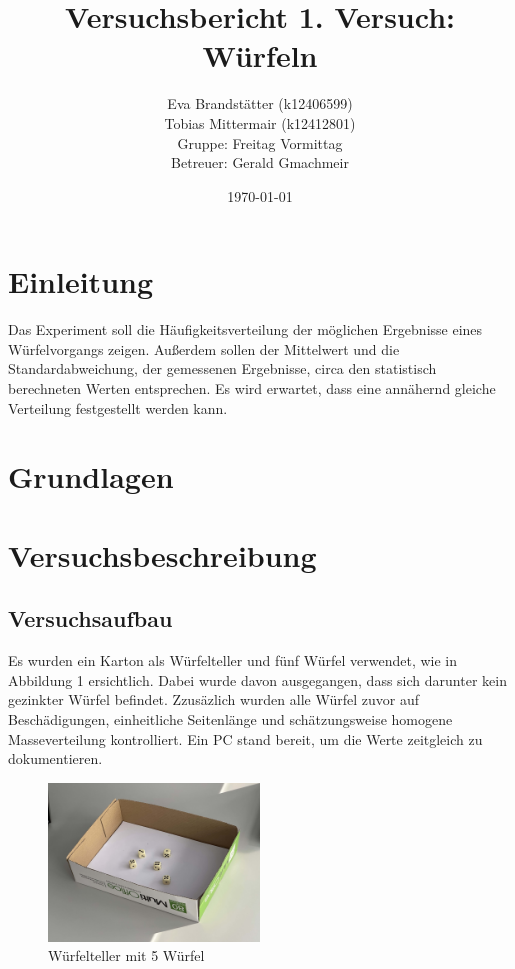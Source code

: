 \documentclass[a4paper,12pt]{article}
\title{Versuchsbericht 1. Versuch: \\ \textbf{Würfeln}}
\author{Eva Brandstätter (k12406599)\\Tobias Mittermair (k12412801)\\Gruppe: Freitag Vormittag\\Betreuer: Gerald Gmachmeir}
\date{\today}
\begin{document}
\maketitle

\section{Einleitung}
Das Experiment soll die Häufigkeitsverteilung der möglichen Ergebnisse eines Würfelvorgangs zeigen. 
Außerdem sollen der Mittelwert und die Standardabweichung, der gemessenen Ergebnisse, circa den statistisch 
berechneten Werten entsprechen. Es wird erwartet, dass eine annähernd gleiche Verteilung festgestellt werden kann.

\section{Grundlagen}

\section{Versuchsbeschreibung}
\subsection{Versuchsaufbau}

Es wurden ein Karton als Würfelteller und fünf Würfel verwendet, wie in Abbildung 1 ersichtlich. Dabei wurde davon ausgegangen, 
dass sich darunter kein gezinkter Würfel befindet. Zzusäzlich wurden alle Würfel zuvor auf Beschädigungen, einheitliche 
Seitenlänge und schätzungsweise homogene Masseverteilung kontrolliert. Ein PC stand bereit, um die Werte zeitgleich zu 
dokumentieren.

\begin{figure}[H]
    \centering
    \includegraphics[width=0.5\textwidth]{bilder/IMG_7612.jpg}
    \caption{Würfelteller mit 5 Würfel}
\end{figure}
\end{document}
